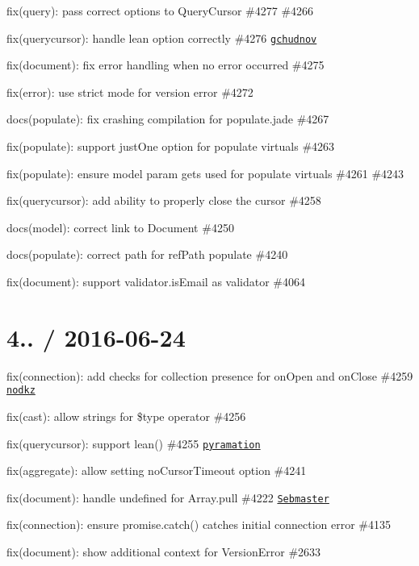 \begin{DoxyItemize}
\item fix(query)\+: pass correct options to Query\+Cursor \#4277 \#4266
\item fix(querycursor)\+: handle lean option correctly \#4276 \href{https://github.com/gchudnov}{\tt gchudnov}
\item fix(document)\+: fix error handling when no error occurred \#4275
\item fix(error)\+: use strict mode for version error \#4272
\item docs(populate)\+: fix crashing compilation for populate.\+jade \#4267
\item fix(populate)\+: support {\ttfamily just\+One} option for populate virtuals \#4263
\item fix(populate)\+: ensure model param gets used for populate virtuals \#4261 \#4243
\item fix(querycursor)\+: add ability to properly close the cursor \#4258
\item docs(model)\+: correct link to Document \#4250
\item docs(populate)\+: correct path for ref\+Path populate \#4240
\item fix(document)\+: support validator.\+is\+Email as validator \#4064
\end{DoxyItemize}

\section*{4.. / 2016-\/06-\/24 }


\begin{DoxyItemize}
\item fix(connection)\+: add checks for collection presence for {\ttfamily on\+Open} and {\ttfamily on\+Close} \#4259 \href{https://github.com/nodkz}{\tt nodkz}
\item fix(cast)\+: allow strings for \$type operator \#4256
\item fix(querycursor)\+: support lean() \#4255 \href{https://github.com/pyramation}{\tt pyramation}
\item fix(aggregate)\+: allow setting no\+Cursor\+Timeout option \#4241
\item fix(document)\+: handle undefined for Array.\+pull \#4222 \href{https://github.com/Sebmaster}{\tt Sebmaster}
\item fix(connection)\+: ensure promise.\+catch() catches initial connection error \#4135
\item fix(document)\+: show additional context for Version\+Error \#2633
\end{DoxyItemize}

